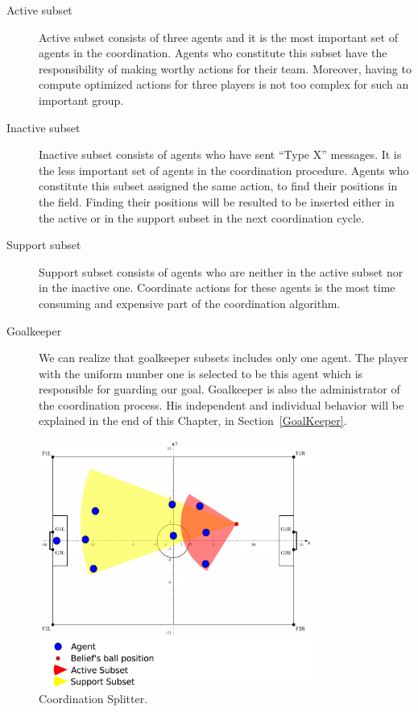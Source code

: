 \begin{description}
\item[Active subset] Active subset consists of three agents and it is the most important set of agents in the coordination. Agents who constitute this subset have the responsibility of making worthy actions for their team. Moreover, having to compute optimized actions for three players is not too complex for such an important group. 

\item[Inactive subset] Inactive subset consists of agents who have sent ``Type X'' messages. It is the less important set of agents in the coordination procedure. Agents who constitute this subset assigned the same action, to find their positions in the field. Finding their positions will be resulted to be inserted either in the active or in the support subset in the next coordination cycle.

\item[Support subset] Support subset consists of agents who are neither in the active subset nor in the inactive one. Coordinate actions for these agents is the most time consuming and expensive part of the coordination algorithm.

\item[Goalkeeper] We can realize that goalkeeper subsets includes only one agent. The player with the uniform number one is selected to be this agent which is responsible for guarding our goal. Goalkeeper is also the administrator of the coordination process. His independent and individual behavior will be explained in the end of this Chapter, in Section~\ref{GoalKeeper}.
\end{description}

\begin{figure}[t!]
\centering
  \includegraphics[width=0.8\textwidth]{Chapter4/figures/Splitter.pdf}
  \caption{Coordination Splitter.} 
  \label{fig:Splitter}
\end{figure}


